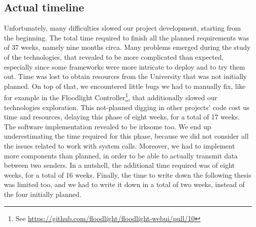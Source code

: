 \subsection{Actual timeline}
Unfortunately, many difficulties slowed our project development, starting from
the beginning. The total time required to finish all the planned requirements
was of 37 weeks, namely nine months circa. Many problems emerged during the
study of the technologies, that revealed to be more complicated than expected,
especially since some frameworks were more intricate to deploy and to try them
out. Time was lost to obtain resources from the University that was not
initially planned. On top of that, we encountered little bugs we had to manually
fix, like for example in the Floodlight Controller\footnote{See
  \url{https://github.com/floodlight/floodlight-webui/pull/10}}, that
additionally slowed our technologies exploration. This not-planned digging in
other projects' code cost us time and resources, delaying this phase of eight
weeks, for a total of 17 weeks. The software implementation revealed to be
irksome too. We end up underestimating the time required for this phase, because
we did not consider all the issues related to work with system calls. Moreover,
we had to implement more components than planned, in order to be able to
actually transmit data between two senders. In a nutshell, the additional time
required was of eight weeks, for a total of 16 weeks. Finally, the time to write
down the following thesis was limited too, and we had to write it down in a
total of two weeks, instead of the four initially planned.
